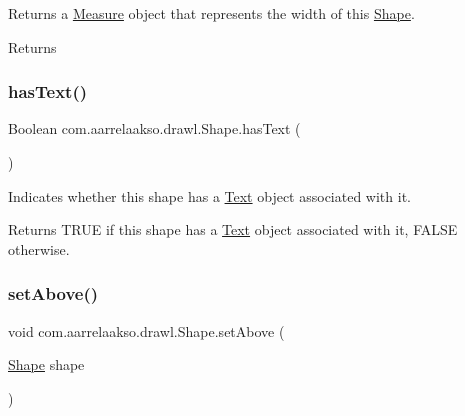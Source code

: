 Returns a \hyperlink{classcom_1_1aarrelaakso_1_1drawl_1_1_measure}{Measure} object that represents the width of this \hyperlink{classcom_1_1aarrelaakso_1_1drawl_1_1_shape}{Shape}. 

\begin{DoxyReturn}{Returns}

\end{DoxyReturn}
\mbox{\label{classcom_1_1aarrelaakso_1_1drawl_1_1_shape_a037a5515b2a6e1df1d1981aa5516e78e}} 
\subsubsection{\texorpdfstring{has\+Text()}{hasText()}}
{\footnotesize\ttfamily Boolean com.\+aarrelaakso.\+drawl.\+Shape.\+has\+Text (\begin{DoxyParamCaption}{ }\end{DoxyParamCaption})\hspace{0.3cm}{\ttfamily [inherited]}}



Indicates whether this shape has a \hyperlink{classcom_1_1aarrelaakso_1_1drawl_1_1_text}{Text} object associated with it. 

\begin{DoxyReturn}{Returns}
T\+R\+UE if this shape has a \hyperlink{classcom_1_1aarrelaakso_1_1drawl_1_1_text}{Text} object associated with it, F\+A\+L\+SE otherwise. 
\end{DoxyReturn}
\mbox{\label{classcom_1_1aarrelaakso_1_1drawl_1_1_shape_a942b3cf3365498dc1ac6b0309ce33b86}} 
\subsubsection{\texorpdfstring{set\+Above()}{setAbove()}\hspace{0.1cm}{\footnotesize\ttfamily [1/2]}}
{\footnotesize\ttfamily void com.\+aarrelaakso.\+drawl.\+Shape.\+set\+Above (\begin{DoxyParamCaption}\item[{\hyperlink{classcom_1_1aarrelaakso_1_1drawl_1_1_shape}{Shape}}]{shape }\end{DoxyParamCaption})\hspace{0.3cm}{\ttfamily [inherited]}}

